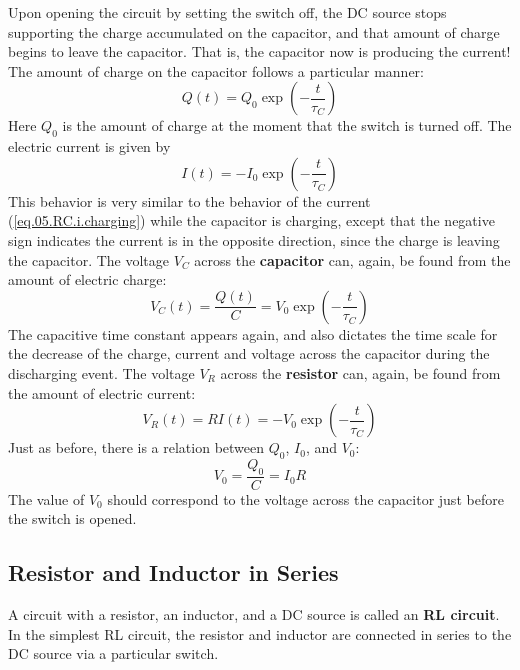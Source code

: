 Upon opening the circuit by setting the switch off, the DC source stops supporting the charge accumulated on the capacitor, and that amount of charge begins to leave the capacitor. That is, the capacitor now is producing the current! The amount of charge on the capacitor follows a particular manner:
\begin{equation}
    Q(t) = Q_{0} \exp\left(-\frac{t}{\tau_{C}}\right)
    \label{eq.05.RC.q.discharging}
\end{equation}
Here $Q_{0}$ is the amount of charge at the moment that the switch is turned off. The electric current is given by
\begin{equation}
    I(t) = - I_{0} \exp\left(-\frac{t}{\tau_{C}}\right)
    \label{eq.05.RC.i.discharging}
\end{equation}
This behavior is very similar to the behavior of the current (\ref{eq.05.RC.i.charging}) while the capacitor is charging, except that the negative sign indicates the current is in the opposite direction, since the charge is leaving the capacitor. The voltage $V_{C}$ across the \textbf{capacitor} can, again, be found from the amount of electric charge:
\begin{equation}
    V_{C}(t) = \frac{Q(t)}{C} = V_{0} \exp\left(-\frac{t}{\tau_{C}}\right)
    \label{eq.05.RC.vC.discharging}
\end{equation}
The capacitive time constant appears again, and also dictates the time scale for the decrease of the charge, current and voltage across the capacitor during the discharging event. The voltage $V_{R}$ across the \textbf{resistor} can, again, be found from the amount of electric current:
\begin{equation}
    V_{R}(t) = R I(t) = - V_{0} \exp\left(-\frac{t}{\tau_{C}}\right)
\end{equation}
Just as before, there is a relation between $Q_{0}$, $I_{0}$, and $V_{0}$:
\begin{equation}
    V_{0} = \frac{Q_{0}}{C} = I_{0} R
\end{equation}
The value of $V_{0}$ should correspond to the voltage across the capacitor just before the switch is opened.
%
\subsection{Resistor and Inductor in Series}
%
A circuit with a resistor, an inductor, and a DC source is called an \textbf{RL circuit}. In the simplest RL circuit, the resistor and inductor are connected in series to the DC source via a particular switch.

